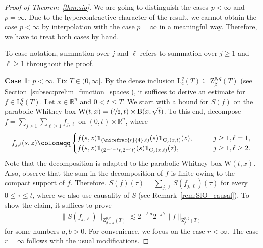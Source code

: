 \documentclass[11pt, leqno]{amsart}
\theoremstyle{definition}
\newcommand{\R}{\mathbb{R}}
\renewcommand{\L}{\mathrm{L}}
\newcommand{\Z}{\mathrm{Z}}
\newcommand{\ann}{\mathrm{C}}
\newcommand{\WB}{\mathrm{W}}
\newcommand{\cc}{\mathrm{c}}
\newcommand{\B}{\mathrm{B}}
\newcommand{\ind}{\mathbf{1}}
\begin{document}
	\begin{proof}[Proof of Theorem~\ref{thm:sio}]
		We are going to distinguish the cases $p < \infty$ and $p = \infty$. Due to the hypercontractive character of the result, we cannot obtain the case $p < \infty$ by interpolation with the case $p = \infty$ in a meaningful way. Therefore, we have to treat both cases by hand.

		To ease notation, summation over $j$ and $\ell$ refers to summation over $j \geq 1$ and $\ell \geq 1$ throughout the proof.

		\textbf{Case 1}: $p < \infty$. Fix $T \in (0,\infty]$. By the dense inclusion $\L^q_\cc(T) \subseteq \Z^{p,q}_\beta(T)$ (see Section~\ref{subsec:prelim_function_spaces}), it suffices to derive an estimate for $f\in \L^q_\cc(T)$. Let $x\in \R^n$ and $0 < t \leq T$. We start with a bound for $S(f)$ on the parabolic Whitney box $\WB(t,x) = (\nicefrac{t}{2},t) \times \B(x,\sqrt{t})$. To this end, decompose $f = \sum_{j \geq 1} \sum_{\ell \geq 1} f_{j,\ell}$ on $(0,t)\times \R^n$, where
		\begin{align}
			\label{eq:def_f_jl}
			f_{j,\ell}(s,z) \coloneqq
			\begin{cases}
				f(s,z) \ind_{(\nicefrac{t}{4}, t)}(s) \ind_{\ann_j(x,t)}(z), \qquad &j\geq 1, \ell = 1, \\
				f(s,z) \ind_{(2^{-\ell-1}t, 2^{-\ell}t)}(s) \ind_{\ann_j(x,t)}(z), \qquad &j \geq1, \ell \geq 2.
			\end{cases}
		\end{align}
		Note that the decomposition is adapted to the parabolic Whitney box $\WB(t,x)$.
		Also, observe that the sum in the decomposition of $f$ is finite owing to the compact support of $f$. Therefore, $S(f)(\tau) = \sum_{j,\ell} S(f_{j,\ell})(\tau)$ for every $0 \leq \tau \leq t$, where we also use causality of $S$ (see Remark~\ref{rem:SIO_causal}).
		To show the claim, it suffices to prove
		\begin{align}
			\label{eq:SIO_thm_key_estimate}
			\| S(f_{j,\ell}) \|_{\Z^{p,r}_{\beta + \kappa}(T)} \lesssim 2^{-\ell a} 2^{-j b} \| f \|_{\Z^{p,q}_{\beta}(T)}
		\end{align}
		for some numbers $a,b > 0$. For convenience, we focus on the case $r < \infty$. The case $r=\infty$ follows with the usual modifications.


\end{proof}
\end{document}
